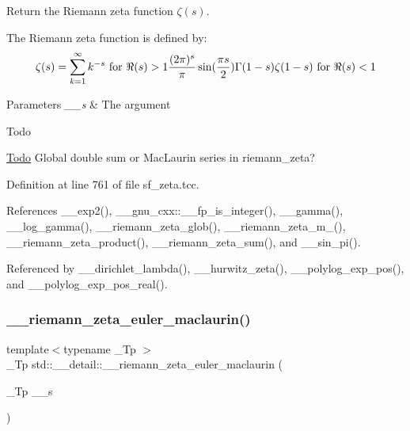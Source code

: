 Return the Riemann zeta function $ \zeta(s) $. 

The Riemann zeta function is defined by\+: \[ \zeta(s) = \sum_{k=1}^{\infty} k^{-s} \mbox{ for } \Re(s) > 1 \\ \frac{(2\pi)^s}{\pi} \sin(\frac{\pi s}{2}) \Gamma(1 - s) \zeta(1 - s) \mbox{ for } \Re(s) < 1 \]


\begin{DoxyParams}{Parameters}
{\em \+\_\+\+\_\+s} & The argument \\
\hline
\end{DoxyParams}
\begin{DoxyRefDesc}{Todo}
\item[\hyperlink{todo__todo000019}{Todo}]Global double sum or Mac\+Laurin series in riemann\+\_\+zeta? \end{DoxyRefDesc}


Definition at line 761 of file sf\+\_\+zeta.\+tcc.



References \+\_\+\+\_\+exp2(), \+\_\+\+\_\+gnu\+\_\+cxx\+::\+\_\+\+\_\+fp\+\_\+is\+\_\+integer(), \+\_\+\+\_\+gamma(), \+\_\+\+\_\+log\+\_\+gamma(), \+\_\+\+\_\+riemann\+\_\+zeta\+\_\+glob(), \+\_\+\+\_\+riemann\+\_\+zeta\+\_\+m\+\_(), \+\_\+\+\_\+riemann\+\_\+zeta\+\_\+product(), \+\_\+\+\_\+riemann\+\_\+zeta\+\_\+sum(), and \+\_\+\+\_\+sin\+\_\+pi().



Referenced by \+\_\+\+\_\+dirichlet\+\_\+lambda(), \+\_\+\+\_\+hurwitz\+\_\+zeta(), \+\_\+\+\_\+polylog\+\_\+exp\+\_\+pos(), and \+\_\+\+\_\+polylog\+\_\+exp\+\_\+pos\+\_\+real().

\mbox{\label{namespacestd_1_1____detail_a84ac805996c4eeb8cbfa181e6e47f0ae}} 
\subsubsection{\texorpdfstring{\+\_\+\+\_\+riemann\+\_\+zeta\+\_\+euler\+\_\+maclaurin()}{\_\_riemann\_zeta\_euler\_maclaurin()}}
{\footnotesize\ttfamily template$<$typename \+\_\+\+Tp $>$ \\
\+\_\+\+Tp std\+::\+\_\+\+\_\+detail\+::\+\_\+\+\_\+riemann\+\_\+zeta\+\_\+euler\+\_\+maclaurin (\begin{DoxyParamCaption}\item[{\+\_\+\+Tp}]{\+\_\+\+\_\+s }\end{DoxyParamCaption})}



